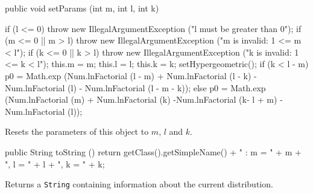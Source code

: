 \begin{code}

   public void setParams (int m, int l, int k)\begin{hide} {
      if (l <= 0)
         throw new IllegalArgumentException ("l must be greater than 0");
      if (m <= 0 || m > l)
         throw new IllegalArgumentException ("m is invalid: 1 <= m < l");
      if (k <= 0 || k > l)
         throw new IllegalArgumentException ("k is invalid: 1 <= k < l");
      this.m = m;
      this.l = l;
      this.k = k;
      setHypergeometric();
      if (k < l - m)
          p0 = Math.exp (Num.lnFactorial (l - m) + Num.lnFactorial (l - k)
                               -Num.lnFactorial (l) - Num.lnFactorial (l - m - k));
      else
          p0 = Math.exp (Num.lnFactorial (m) + Num.lnFactorial (k)
                               -Num.lnFactorial (k- l + m) - Num.lnFactorial (l));
   }\end{hide}
\end{code}
 \begin{tabb}
    Resets the parameters of this object to $m$, $l$ and $k$.
 \end{tabb}
\begin{hide}\begin{code}

   public String toString () {
      return getClass().getSimpleName() + " : m = " + m + ", l = " + l + ", k = " + k;
   }
\end{code}
\begin{tabb}
   Returns a \texttt{String} containing information about the current distribution.
\end{tabb}\end{hide}
\begin{code}\begin{hide}
}\end{hide}\end{code}

